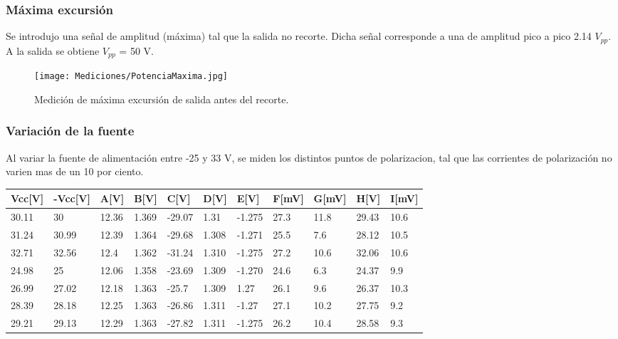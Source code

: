 		\subsubsection{Máxima excursión}
		Se introdujo una señal de amplitud (máxima) tal que la salida no recorte. Dicha señal corresponde a una
		de amplitud pico a pico 2.14 $V_{pp}$. A la salida se obtiene $V_{pp}$ = 50 V.

		\begin{figure}[h!]
			\centering
			\texttt{[image: Mediciones/PotenciaMaxima.jpg]}
			\caption{Medición de máxima excursión de salida antes del recorte.}
			\label{fig:MaxExcur}
		\end{figure}

		\subsubsection{Variación de la fuente}
		Al variar la fuente de alimentación entre -25 y 33 V, se miden los distintos puntos de polarizacion, tal que las corrientes de polarización no varien mas de un 10 por ciento.
		\begin{table}[]
		\begin{tabular}{|l|l|l|l|l|l|l|l|l|l|l|}
		\hline
		Vcc{[}V{]} & -Vcc{[}V{]} & A{[}V{]} & B{[}V{]} & C{[}V{]} & D{[}V{]} & E{[}V{]} & F{[}mV{]} & G{[}mV{]} & H{[}V{]} & I{[}mV{]} \\ \hline
		30.11      & 30          & 12.36    & 1.369    & -29.07   & 1.31     & -1.275   & 27.3      & 11.8      & 29.43    & 10.6      \\ \hline
		31.24      & 30.99       & 12.39    & 1.364    & -29.68   & 1.308    & -1.271   & 25.5      & 7.6       & 28.12    & 10.5      \\ \hline
		32.71      & 32.56       & 12.4     & 1.362    & -31.24   & 1.310    & -1.275   & 27.2      & 10.6      & 32.06    & 10.6      \\ \hline
		24.98      & 25          & 12.06    & 1.358    & -23.69   & 1.309    & -1.270   & 24.6      & 6.3       & 24.37    & 9.9       \\ \hline
		26.99      & 27.02       & 12.18    & 1.363    & -25.7    & 1.309    & 1.27     & 26.1      & 9.6       & 26.37    & 10.3      \\ \hline
		28.39      & 28.18       & 12.25    & 1.363    & -26.86   & 1.311    & -1.27    & 27.1      & 10.2      & 27.75    & 9.2       \\ \hline
		29.21      & 29.13       & 12.29    & 1.363    & -27.82   & 1.311    & -1.275   & 26.2      & 10.4      & 28.58    & 9.3       \\ \hline
		\end{tabular}
		\end{table}

